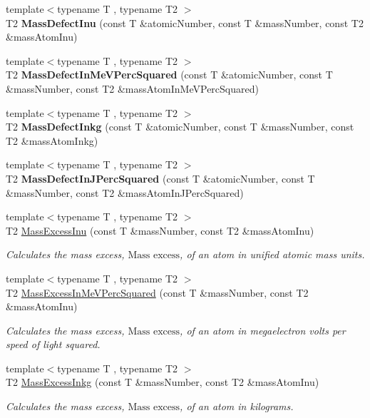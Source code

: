 \begin{DoxyCompactItemize}
{\footnotesize template$<$typename T , typename T2 $>$ }\\T2 {\bfseries Mass\+Defect\+Inu} (const T \&atomic\+Number, const T \&mass\+Number, const T2 \&mass\+Atom\+Inu)
\item 
{\footnotesize template$<$typename T , typename T2 $>$ }\\T2 {\bfseries Mass\+Defect\+In\+Me\+V\+Perc\+Squared} (const T \&atomic\+Number, const T \&mass\+Number, const T2 \&mass\+Atom\+In\+Me\+V\+Perc\+Squared)
\item 
{\footnotesize template$<$typename T , typename T2 $>$ }\\T2 {\bfseries Mass\+Defect\+Inkg} (const T \&atomic\+Number, const T \&mass\+Number, const T2 \&mass\+Atom\+Inkg)
\item 
{\footnotesize template$<$typename T , typename T2 $>$ }\\T2 {\bfseries Mass\+Defect\+In\+J\+Perc\+Squared} (const T \&atomic\+Number, const T \&mass\+Number, const T2 \&mass\+Atom\+In\+J\+Perc\+Squared)
\item 
{\footnotesize template$<$typename T , typename T2 $>$ }\\T2 \hyperlink{group___mass_excess_ga61c6f557bd742126c0c76e88cf7740ad}{Mass\+Excess\+Inu} (const T \&mass\+Number, const T2 \&mass\+Atom\+Inu)
\begin{DoxyCompactList}\small\item\em Calculates the mass excess, $\text{Mass excess}$, of an atom in unified atomic mass units. \end{DoxyCompactList}\item 
{\footnotesize template$<$typename T , typename T2 $>$ }\\T2 \hyperlink{group___mass_excess_ga99a93b88df3425b7a153c32c05fa5a88}{Mass\+Excess\+In\+Me\+V\+Perc\+Squared} (const T \&mass\+Number, const T2 \&mass\+Atom\+Inu)
\begin{DoxyCompactList}\small\item\em Calculates the mass excess, $\text{Mass excess}$, of an atom in megaelectron volts per speed of light squared. \end{DoxyCompactList}\item 
{\footnotesize template$<$typename T , typename T2 $>$ }\\T2 \hyperlink{group___mass_excess_gab72a3640886092be8b9c9662020a2306}{Mass\+Excess\+Inkg} (const T \&mass\+Number, const T2 \&mass\+Atom\+Inu)
\begin{DoxyCompactList}\small\item\em Calculates the mass excess, $\text{Mass excess}$, of an atom in kilograms. \end{DoxyCompactList}\item 

\end{DoxyCompactItemize}

